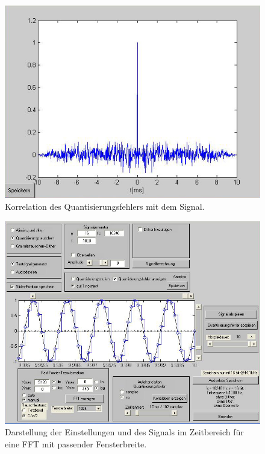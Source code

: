 \begin{figure}[h!]
\centering
\includegraphics[width=\columnwidth]{figures/Aufg1/2_1_korr.JPG} 
\caption{Korrelation des Quantisierungsfehlers mit dem Signal.}
\end{figure}

\begin{figure}[h!]
\centering
\includegraphics[width=\columnwidth]{figures/Aufg1/2_2_fenster_ok_einstell.JPG} 
\caption{Darstellung der Einstellungen und des Signals im Zeitbereich für eine FFT mit passender Fensterbreite.}
\end{figure}


